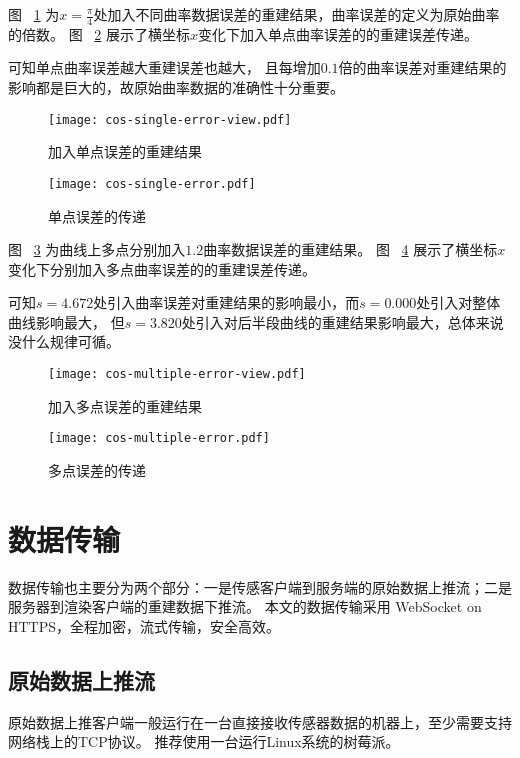 图 ~\ref{fig:cos-single-error-view} 为$x = \frac{\pi}{4}$处加入不同曲率数据误差的重建结果，曲率误差的定义为原始曲率的倍数。
图 ~\ref{fig:cos-single-error} 展示了横坐标$x$变化下加入单点曲率误差的的重建误差传递。

可知单点曲率误差越大重建误差也越大，
且每增加$0.1$倍的曲率误差对重建结果的影响都是巨大的，故原始曲率数据的准确性十分重要。

\begin{figure}
\centering
\texttt{[image: cos-single-error-view.pdf]}
\caption{加入单点误差的重建结果}
\label{fig:cos-single-error-view}
\end{figure}

\begin{figure}
\centering
\texttt{[image: cos-single-error.pdf]}
\caption{单点误差的传递}
\label{fig:cos-single-error}
\end{figure}

图 ~\ref{fig:cos-multiple-error-view} 为曲线上多点分别加入$1.2$曲率数据误差的重建结果。
图 ~\ref{fig:cos-multiple-error} 展示了横坐标$x$变化下分别加入多点曲率误差的的重建误差传递。

可知$s=4.672$处引入曲率误差对重建结果的影响最小，而$s=0.000$处引入对整体曲线影响最大，
但$s=3.820$处引入对后半段曲线的重建结果影响最大，总体来说没什么规律可循。

\begin{figure}
\centering
\texttt{[image: cos-multiple-error-view.pdf]}
\caption{加入多点误差的重建结果}
\label{fig:cos-multiple-error-view}
\end{figure}

\begin{figure}
\centering
\texttt{[image: cos-multiple-error.pdf]}
\caption{多点误差的传递}
\label{fig:cos-multiple-error}
\end{figure}

\section{数据传输}
数据传输也主要分为两个部分：一是传感客户端到服务端的原始数据上推流；二是服务器到渲染客户端的重建数据下推流。
本文的数据传输采用 WebSocket on HTTPS，全程加密，流式传输，安全高效。

\subsection{原始数据上推流}

原始数据上推客户端一般运行在一台直接接收传感器数据的机器上，至少需要支持网络栈上的TCP协议。
推荐使用一台运行Linux系统的树莓派。

